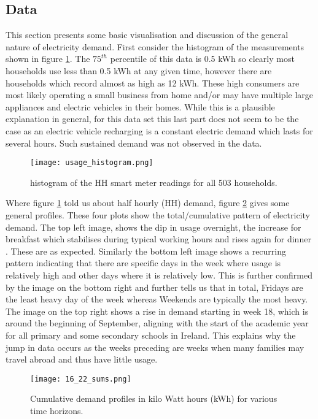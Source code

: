 \documentclass[a4paper]{article}
\begin{document}
\subsection{Data}
\label{subsec:basic} 
This section presents some basic visualisation and discussion of the general nature of electricity demand. First consider the histogram of the measurements shown in figure \ref{fig:hist}. The $75^{th}$ percentile of this data is 0.5 kWh so clearly most households use less than 0.5 kWh at any given time, however there are households which record almost as high as 12 kWh. These high consumers are most likely operating a small business from home and/or may have multiple large appliances and electric vehicles in their homes.  While this is a plausible explanation in general, for this data set this last part does not seem to be the case as an electric vehicle recharging is a constant electric demand which lasts for several hours. Such sustained demand was not observed in the data.

\begin{figure}
\centering
\texttt{[image: usage\_histogram.png]}
\caption{histogram of the HH smart meter readings for all 503 households.}
\label{fig:hist} 
\end{figure}

Where figure \ref{fig:hist} told us about half hourly (HH) demand, figure \ref{fig:sums} gives some general profiles. These four plots show the total/cumulative pattern of electricity demand. The top left image, shows the dip in usage overnight, the increase for breakfast which stabilises during typical working hours and rises again for dinner . These are as expected. Similarly the bottom left image shows a recurring pattern indicating that there are specific days in the week where usage is relatively high and other days where it is relatively low. This is further confirmed by the image on the bottom right and further tells us that in total, Fridays are the least heavy day of the week whereas Weekends are typically the most heavy. The image on the top right shows a rise in demand starting in week 18, which is around the beginning of September, aligning with the start of the academic year for all primary and some secondary schools in Ireland. This explains why the jump in data occurs as the weeks preceding are weeks when many families may travel abroad and thus have little usage.

\begin{figure}
\centering
\texttt{[image: 16\_22\_sums.png]}
\caption{Cumulative demand profiles in kilo Watt hours (kWh) for various time horizons.}
\label{fig:sums} 
\end{figure}
\end{document}

